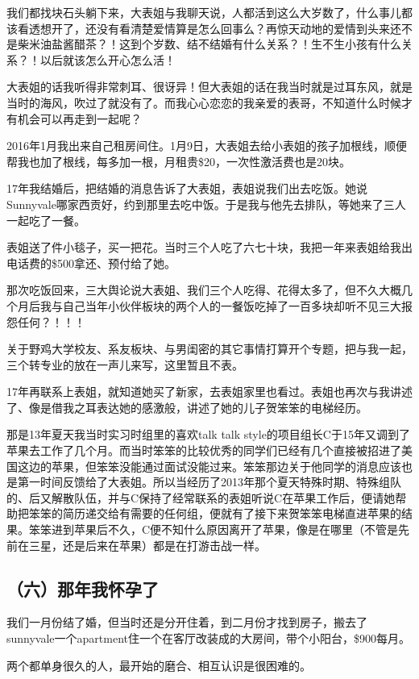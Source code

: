 \documentclass[9pt, b5paper]{article}
\begin{document}
我们都找块石头躺下来，大表姐与我聊天说，人都活到这么大岁数了，什么事儿都该看透想开了，还没有看清楚爱情算是怎么回事么？再惊天动地的爱情到头来还不是柴米油盐酱醋茶？！这到个岁数、结不结婚有什么关系？！生不生小孩有什么关系？！以后就该怎么开心怎么活！

大表姐的话我听得非常刺耳、很讶异！但大表姐的话在我当时就是过耳东风，就是当时的海风，吹过了就没有了。而我心心恋恋的我亲爱的表哥，不知道什么时候才有机会可以再走到一起呢？

2016年1月我出来自己租房间住。1月9日，大表姐去给小表姐的孩子加根线，顺便帮我也加了根线，每多加一根，月租贵\$20，一次性激活费也是20块。 

17年我结婚后，把结婚的消息告诉了大表姐，表姐说我们出去吃饭。她说Sunnyvale哪家西贡好，约到那里去吃中饭。于是我与他先去排队，等她来了三人一起吃了一餐。

表姐送了件小毯子，买一把花。当时三个人吃了六七十块，我把一年来表姐给我出电话费的\$500拿还、预付给了她。

那次吃饭回来，三大舆论说大表姐、我们三个人吃得、花得太多了，但不久大概几个月后我与自己当年小伙伴板块的两个人的一餐饭吃掉了一百多块却听不见三大报怨任何？！！！

关于野鸡大学校友、系友板块、与男闺密的其它事情打算开个专题，把与我一起，三个转专业的放在一声儿来写，这里暂且不表。 

17年再联系上表姐，就知道她买了新家，去表姐家里也看过。表姐也再次与我讲述了、像是借我之耳表达她的感激般，讲述了她的儿子贺笨笨的电梯经历。

那是13年夏天我当时实习时组里的喜欢talk talk style的项目组长C于15年又调到了苹果去工作了几个月。而当时笨笨的比较优秀的同学们已经有几个直接被招进了美国这边的苹果，但笨笨没能通过面试没能过来。笨笨那边关于他同学的消息应该也是第一时间反馈给了大表姐。所以当经历了2013年那个夏天特殊时期、特殊组队的、后又解散队伍，并与C保持了经常联系的表姐听说C在苹果工作后，便请她帮助把笨笨的简历递交给有需要的任何组，便就有了接下来贺笨笨电梯直进苹果的结果。笨笨进到苹果后不久，C便不知什么原因离开了苹果，像是在哪里（不管是先前在三星，还是后来在苹果）都是在打游击战一样。 

\subsection{（六）那年我怀孕了}
\label{sec:org02abbd1}

我们一月份结了婚，但当时还是分开住着，到二月份才找到房子，搬去了sunnyvale一个apartment住一个在客厅改装成的大房间，带个小阳台，\$900每月。

两个都单身很久的人，最开始的磨合、相互认识是很困难的。
\end{document}
